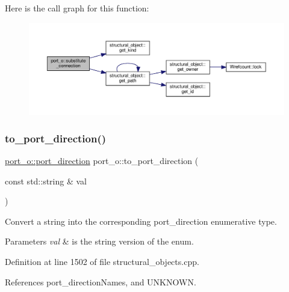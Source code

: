 Here is the call graph for this function\+:
\nopagebreak
\begin{figure}[H]
\begin{center}
\leavevmode
\includegraphics[width=350pt]{df/d75/structport__o_a3e10db29a011de4d51efb9b3a522479c_cgraph}
\end{center}
\end{figure}
\mbox{\label{structport__o_a6e94ff71031344773513bc3985a65c41}} 
\subsubsection{\texorpdfstring{to\+\_\+port\+\_\+direction()}{to\_port\_direction()}}
{\footnotesize\ttfamily \hyperlink{structport__o_adb254df5665ff28b0769491cc3899fd5}{port\+\_\+o\+::port\+\_\+direction} port\+\_\+o\+::to\+\_\+port\+\_\+direction (\begin{DoxyParamCaption}\item[{const std\+::string \&}]{val }\end{DoxyParamCaption})\hspace{0.3cm}{\ttfamily [static]}}



Convert a string into the corresponding port\+\_\+direction enumerative type. 


\begin{DoxyParams}{Parameters}
{\em val} & is the string version of the enum. \\
\hline
\end{DoxyParams}


Definition at line 1502 of file structural\+\_\+objects.\+cpp.



References port\+\_\+direction\+Names, and U\+N\+K\+N\+O\+WN.



